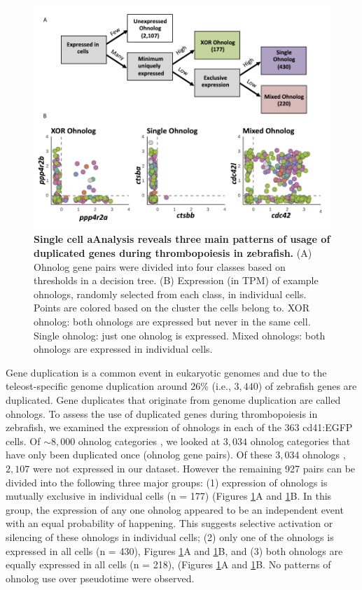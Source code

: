 \begin{figure}
    \centering
    \includegraphics[width=\textwidth]{"Figure7"}
    \caption[Single cell analysis reveals three main patterns of usage of duplicated genes during thrombopoiesis in zebrafish]{\textbf{Single cell aAnalysis reveals three main patterns of usage of duplicated genes during thrombopoiesis in zebrafish.} (A) Ohnolog gene pairs were divided into four classes based on thresholds in a decision tree. (B) Expression (in TPM) of example ohnologs, randomly selected from each class, in individual cells. Points are colored based on the cluster the cells belong to. XOR ohnolog: both ohnologs are expressed but never in the same cell. Single ohnolog: just one ohnolog is expressed. Mixed ohnologs: both ohnologs are expressed in individual cells.}
    \label{fig:ohnologs}
\end{figure}

Gene duplication is a common event in eukaryotic genomes \cite{Meyer1999-lb} and due to the teleost-specific genome duplication around 26\% (i.e., \( 3,440 \)) \cite{Howe2013-ul} of zebrafish genes are duplicated. Gene duplicates that originate from genome duplication are called ohnologs. To assess the use of duplicated genes during thrombopoiesis in zebrafish, we examined the expression of ohnologs in each of the 363 cd41:EGFP cells. Of \( \sim 8,000 \) ohnolog categories \cite{Howe2013-ul}, we looked at \( 3,034 \) ohnolog categories that have only been duplicated once (ohnolog gene pairs). Of these \( 3,034 \) ohnologs \cite{Howe2013-ul}, \( 2,107 \) were not expressed in our dataset. However the remaining 927 pairs can be divided into the following three major groups: (1) expression of ohnologs is mutually exclusive in individual cells (n = 177) (Figures \ref{fig:ohnologs}A and \ref{fig:ohnologs}B. In this group, the expression of any one ohnolog appeared to be an independent event with an equal probability of happening. This suggests selective activation or silencing of these ohnologs in individual cells; (2) only one of the ohnologs is expressed in all cells (n = 430), Figures \ref{fig:ohnologs}A and \ref{fig:ohnologs}B, and (3) both ohnologs are equally expressed in all cells (n = 218), (Figures \ref{fig:ohnologs}A and \ref{fig:ohnologs}B. No patterns of ohnolog use over pseudotime were observed.


